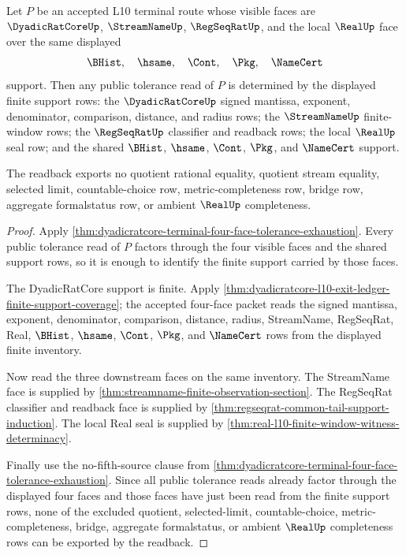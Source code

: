 \begin{theorem}
\label{thm:dyadicratcore-terminal-tolerance-finite-support-readback}
Let $P$ be an accepted L10 terminal route whose visible faces are $\DyadicRatCoreUp$, $\StreamNameUp$, $\RegSeqRatUp$, and the local $\RealUp$ face over the same displayed
$$
\BHist,\quad \hsame,\quad \Cont,\quad \Pkg,\quad \NameCert
$$
support. Then any public tolerance read of $P$ is determined by the displayed finite support rows: the $\DyadicRatCoreUp$ signed mantissa, exponent, denominator, comparison, distance, and radius rows; the $\StreamNameUp$ finite-window rows; the $\RegSeqRatUp$ classifier and readback rows; the local $\RealUp$ seal row; and the shared $\BHist$, $\hsame$, $\Cont$, $\Pkg$, and $\NameCert$ support.

The readback exports no quotient rational equality, quotient stream equality, selected limit, countable-choice row, metric-completeness row, bridge row, aggregate formalstatus row, or ambient $\RealUp$ completeness.
\end{theorem}
\begin{proof}
Apply \autoref{thm:dyadicratcore-terminal-four-face-tolerance-exhaustion}. Every public tolerance read of $P$ factors through the four visible faces and the shared support rows, so it is enough to identify the finite support carried by those faces.

The DyadicRatCore support is finite. Apply \autoref{thm:dyadicratcore-l10-exit-ledger-finite-support-coverage}; the accepted four-face packet reads the signed mantissa, exponent, denominator, comparison, distance, radius, StreamName, RegSeqRat, Real, $\BHist$, $\hsame$, $\Cont$, $\Pkg$, and $\NameCert$ rows from the displayed finite inventory.

Now read the three downstream faces on the same inventory. The StreamName face is supplied by \autoref{thm:streamname-finite-observation-section}. The RegSeqRat classifier and readback face is supplied by \autoref{thm:regseqrat-common-tail-support-induction}. The local Real seal is supplied by \autoref{thm:real-l10-finite-window-witness-determinacy}.

Finally use the no-fifth-source clause from \autoref{thm:dyadicratcore-terminal-four-face-tolerance-exhaustion}. Since all public tolerance reads already factor through the displayed four faces and those faces have just been read from the finite support rows, none of the excluded quotient, selected-limit, countable-choice, metric-completeness, bridge, aggregate formalstatus, or ambient $\RealUp$ completeness rows can be exported by the readback.
\end{proof}


